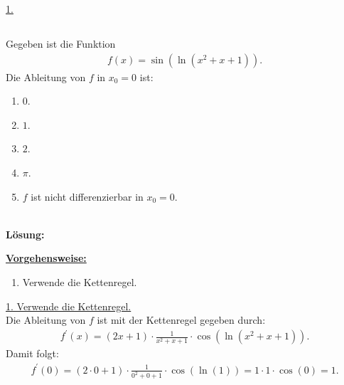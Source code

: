 \underline{1. }\\



\newpage
\subsection*{}
Gegeben ist die Funktion
\begin{align*}
	f(x) = \sin(\ln(x^2 + x + 1)).
\end{align*}
Die Ableitung von $f$ in $x_0 = 0 $ ist:
\renewcommand{\labelenumi}{(\alph{enumi})}
\begin{enumerate}
	\item 
	$ 0$.
	\item
	$ 1 $.
	\item
	$ 2 $.
	\item
	$ \pi $.
	\item
	$f$ ist nicht differenzierbar in $x_0 = 0$.
\end{enumerate}
\ \\
\textbf{Lösung:}
\begin{mdframed}
\underline{\textbf{Vorgehensweise:}}
\renewcommand{\labelenumi}{\theenumi.}
\begin{enumerate}
\item Verwende die Kettenregel.
\end{enumerate}
\end{mdframed}
\underline{1. Verwende die Kettenregel.}\\
Die Ableitung von $f$ ist mit der Kettenregel gegeben durch:
\begin{align*}
	f^\prime(x) = (2x +1) \cdot \frac{1}{x^2 +x +1 } \cdot  \cos (\ln(x^2 + x +1)).
\end{align*}
Damit folgt:
\begin{align*}
	f^\prime(0)  =(2\cdot 0 +1 ) \cdot \frac{1}{0^2 + 0 +1} \cdot \cos(\ln(1))
	= 1 \cdot 1 \cdot \cos(0) = 1.
\end{align*}

\newpage
